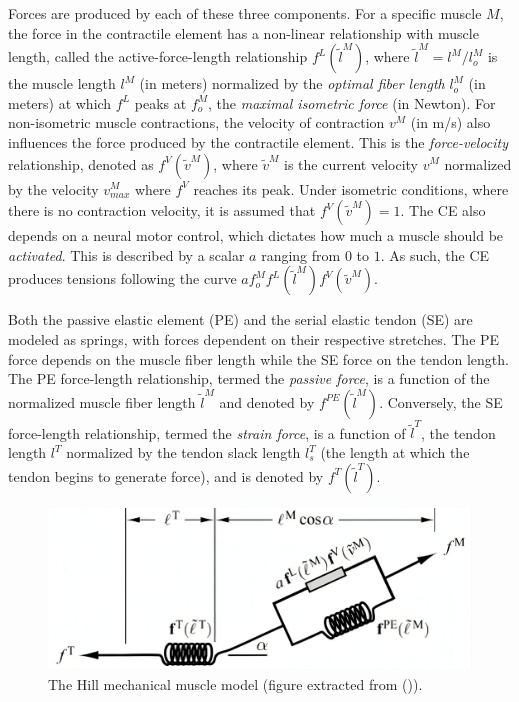 Forces are produced by each of these three components. For a specific muscle $M$, the force in the contractile element has a non-linear relationship with muscle length, called the active-force-length relationship $f^L(\tilde{l}^M)$, where $\tilde{l}^M = l^M / l_o^M$ is the muscle length $l^M$ (in meters) normalized by the \emph{optimal fiber length} $l_o^M$ (in meters) at which $f^L$ peaks at $f_o^M$, the \emph{maximal isometric force} (in Newton). For non-isometric muscle contractions, the velocity of contraction $v^M$ (in m/s) also influences the force produced by the contractile element. This is the \emph{force-velocity} relationship, denoted as $f^V(\tilde{v}^M)$, where $\tilde{v}^M$ is the current velocity $v^M$ normalized by the velocity $v^M_{max}$ where $f^V$ reaches its peak. Under isometric conditions, where there is no contraction velocity, it is assumed that $f^V(\tilde{v}^M) = 1$. The CE also depends on a neural motor control, which dictates how much a muscle should be \emph{activated}. This is described by a scalar $a$ ranging from $0$ to $1$. As such, the CE produces tensions following the curve $af_o^Mf^L(\tilde{l}^M)f^V(\tilde{v}^M)$.

Both the passive elastic element (PE) and the serial elastic tendon (SE) are modeled as springs, with forces dependent on their respective stretches. The PE force depends on the muscle fiber length while the SE force on the tendon length. The PE force-length relationship, termed the \emph{passive force}, is a function of the normalized muscle fiber length $\tilde{l}^M$ and denoted by $f^{PE}(\tilde{l}^M)$. Conversely, the SE force-length relationship, termed the \emph{strain force}, is a function of $\tilde{l}^T$, the tendon length $l^T$ normalized by the tendon slack length $l_s^T$ (the length at which the tendon begins to generate force), and is denoted by $f^T(\tilde{l}^T)$.

\begin{figure}[!htb]
    \centering
    \captionsetup{justification=centering}
    \begin{minipage}{1\linewidth}
        \captionsetup{justification=centering}
        \centering
        \includegraphics[trim={0 0 0 0}, clip, width=0.6\linewidth]{img/chapter_4/hill_model.png}
    \end{minipage}
    \caption{The Hill mechanical muscle model (figure extracted from (\cite{millardFlexingComputationalMuscle2013a})).}
    \label{fig:hil_model}
\end{figure}

